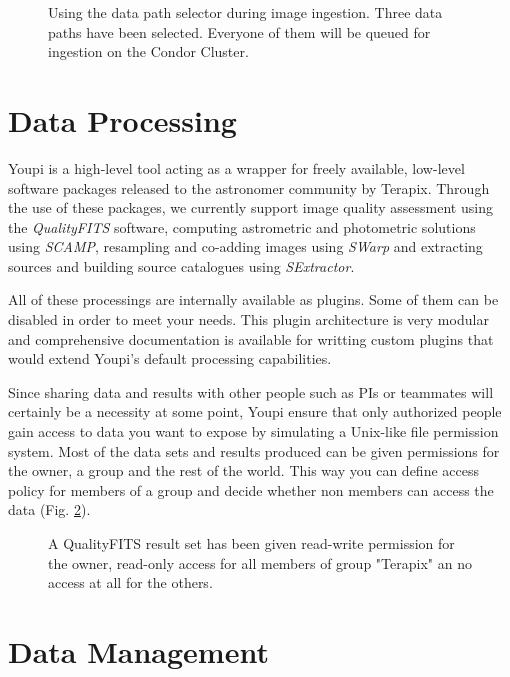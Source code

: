 \documentclass[11pt,twoside]{article}  %
\begin{document}
\begin{figure}[h]
\caption{Using the data path selector during image ingestion. Three data paths have 
been selected. Everyone of them will be queued for ingestion on the Condor Cluster.}\label{fig:pathsel}
\end{figure}

\section{Data Processing}

Youpi is a high-level tool acting as a wrapper for freely available, low-level software 
packages released to the astronomer community by Terapix. Through the use of these packages, 
we currently support image quality assessment using the \emph{QualityFITS} software, 
computing astrometric and photometric solutions using \emph{SCAMP}, resampling and co-adding 
images using \emph{SWarp} and extracting sources and building source catalogues using 
\emph{SExtractor}.

All of these processings are internally available as plugins. Some of them can be disabled 
in order to meet your needs. This plugin architecture is very modular and comprehensive 
documentation is available for writting custom plugins that would extend Youpi's default 
processing capabilities.

Since sharing data and results with other people such as PIs or teammates will certainly 
be a necessity at some point, Youpi ensure that only authorized people gain access to data 
you want to expose by simulating a Unix-like file permission system. Most of the data sets 
and results produced can be given permissions for the owner, a group and the rest of the 
world. This way you can define access policy for members of a group and decide whether non 
members can access the data (Fig. \ref{fig:permissions}).

\begin{figure}[h!]
\caption{A QualityFITS result set has been given read-write permission for the owner, read-only 
access for all members of group "Terapix" an no access at all for the others.}\label{fig:permissions}
\end{figure}

\section{Data Management}
\end{document}

